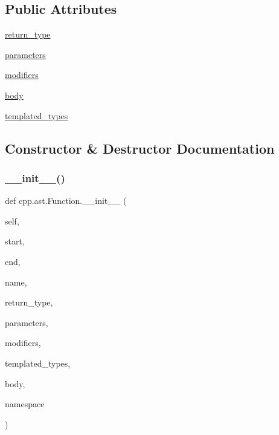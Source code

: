 \subsection*{Public Attributes}
\begin{DoxyCompactItemize}
\item 
\mbox{\hyperlink{classcpp_1_1ast_1_1Function_af750fd788d7ab33163ee066534780212}{return\+\_\+type}}
\item 
\mbox{\hyperlink{classcpp_1_1ast_1_1Function_a0e61ef47af9cf2fd4402dbd8cab631ef}{parameters}}
\item 
\mbox{\hyperlink{classcpp_1_1ast_1_1Function_ad30eed435f1ff9ff34ade9cc0d7be121}{modifiers}}
\item 
\mbox{\hyperlink{classcpp_1_1ast_1_1Function_a8e25e5016b23b38e32acf2df529c0650}{body}}
\item 
\mbox{\hyperlink{classcpp_1_1ast_1_1Function_a57bb03218bade3240137a0d91c467cb6}{templated\+\_\+types}}
\end{DoxyCompactItemize}


\subsection{Constructor \& Destructor Documentation}
\mbox{\label{classcpp_1_1ast_1_1Function_ab5270f5d353ec5e9dcd136e4cc6c7f6c}} 
\subsubsection{\texorpdfstring{\_\_init\_\_()}{\_\_init\_\_()}}
{\footnotesize\ttfamily def cpp.\+ast.\+Function.\+\_\+\+\_\+init\+\_\+\+\_\+ (\begin{DoxyParamCaption}\item[{}]{self,  }\item[{}]{start,  }\item[{}]{end,  }\item[{}]{name,  }\item[{}]{return\+\_\+type,  }\item[{}]{parameters,  }\item[{}]{modifiers,  }\item[{}]{templated\+\_\+types,  }\item[{}]{body,  }\item[{}]{namespace }\end{DoxyParamCaption})}




